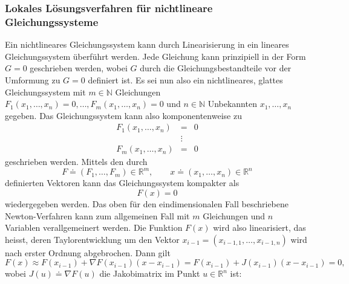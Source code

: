 \documentclass[a4paper,12pt]{article}
\numberwithin{equation}{section}
\begin{document}
\subsubsection{Lokales Lösungsverfahren für nichtlineare Gleichungssysteme}\label{sec:lokloesnonlinear}
Ein nichtlineares Gleichungssystem kann durch Linearisierung in ein lineares Gleichungssystem überführt werden. Jede Gleichung kann prinzipiell in der Form $G = 0$ geschrieben werden, wobei $G$ durch die Gleichungsbestandteile vor der Umformung zu $G=0$ definiert ist. Es sei nun also ein nichtlineares, glattes Gleichungssystem mit $m\in \mathbb{N}$ Gleichungen $F_1(x_1,\dots,x_n) = 0, \dots, F_m(x_1,\dots,x_n) = 0$ und $n\in\mathbb{N}$ Unbekannten $x_1,\dots,x_n$ gegeben. Das Gleichungssystem kann also komponentenweise zu \begin{equation}\label{eq:NonLinearMultipleComp}
\begin{matrix}
F_1(x_1,\dots,x_n) & = & 0 \\
 & \vdots & \\
F_m(x_1,\dots,x_n) & = & 0
\end{matrix}
\end{equation} geschrieben werden. Mittels den durch \begin{equation}
F \doteq (F_1,\dots,F_m) \in \mathbb{R}^m, \qquad x \doteq (x_1,\dots,x_n)\in \mathbb{R}^n
\end{equation} definierten Vektoren kann das Gleichungssystem kompakter als \begin{equation}
F(x) = 0
\end{equation} wiedergegeben werden. Das oben für den eindimensionalen Fall beschriebene Newton-Verfahren kann zum allgemeinen Fall mit $m$ Gleichungen und $n$ Variablen
verallgemeinert werden. Die Funktion $F(x)$ wird also linearisiert, das heisst, deren Taylorentwicklung um den Vektor $x_{i-1} = (x_{i-1,1},\dots,x_{i-1,n})$ wird nach erster Ordnung abgebrochen. Dann gilt \begin{equation}
F(x) \approx F(x_{i-1}) + \nabla F(x_{i-1})(x-x_{i-1}) = F(x_{i-1}) + J(x_{i-1})(x-x_{i-1})=0,
\end{equation} wobei $J(u) \doteq \nabla F(u)$ die Jakobimatrix im Punkt $u \in \mathbb{R}^n$ ist:
\end{document}
